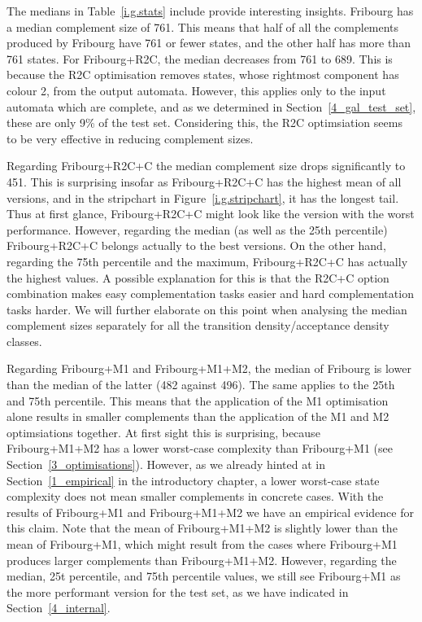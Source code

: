 The medians in Table~\ref{i.g.stats} include provide interesting insights. Fribourg has a median complement size of 761. This means that half of all the complements produced by Fribourg have 761 or fewer states, and the other half has more than 761 states. For Fribourg+R2C, the median decreases from 761 to 689. This is because the R2C optimisation removes states, whose rightmost component has colour 2, from the output automata. However, this applies only to the input automata which are complete, and as we determined in Section~\ref{4_gal_test_set}, these are only 9\% of the \goal{} test set. Considering this, the R2C optimsiation seems to be very effective in reducing complement sizes.

Regarding Fribourg+R2C+C the median complement size drops significantly to 451. This is surprising insofar as Fribourg+R2C+C has the highest mean of all versions, and in the stripchart in Figure~\ref{i.g.stripchart}, it has the longest tail. Thus at first glance, Fribourg+R2C+C might look like the version with the worst performance. However, regarding the median (as well as the 25th percentile) Fribourg+R2C+C belongs actually to the best versions. On the other hand, regarding the 75th percentile and the maximum, Fribourg+R2C+C has actually the highest values. A possible explanation for this is that the R2C+C option combination makes easy complementation tasks easier and hard complementation tasks harder. We will further elaborate on this point when analysing the median complement sizes separately for all the transition density/acceptance density classes. 

Regarding Fribourg+M1 and Fribourg+M1+M2, the median of Fribourg is lower than the median of the latter (482 against 496). The same applies to the 25th and 75th percentile. This means that the application of the M1 optimisation alone results in smaller complements than the application of the M1 and M2 optimsiations together. At first sight this is surprising, because Fribourg+M1+M2 has a lower worst-case complexity than Fribourg+M1 (see Section~\ref{3_optimisations}). However, as we already hinted at in Section~\ref{1_empirical} in the introductory chapter, a lower worst-case state complexity does not mean smaller complements in concrete cases. With the results of Fribourg+M1 and Fribourg+M1+M2 we have an empirical evidence for this claim. Note that the mean of Fribourg+M1+M2 is slightly lower than the mean of Fribourg+M1, which might result from the cases where Fribourg+M1 produces larger complements than Fribourg+M1+M2. However, regarding the median, 25t percentile, and 75th percentile values, we still see Fribourg+M1 as the more performant version for the \goal{} test set, as we have indicated in Section~\ref{4_internal}.

